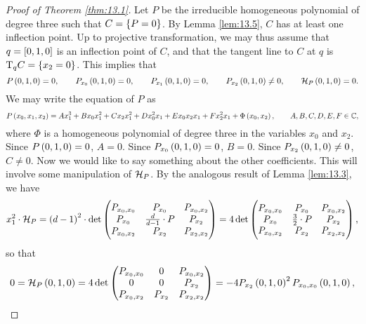 \begin{proof}[Proof of Theorem \ref{thm:13.1}]
Let $ P $ be the irreducible homogeneous polynomial of degree three such that $ C = \cbr{P = 0} $. By Lemma \ref{lem:13.5}, $ C $ has at least one inflection point. Up to projective transformation, we may thus assume that $ q = \sbr{0, 1, 0} $ is an inflection point of $ C $, and that the tangent line to $ C $ at $ q $ is $ \T_q C = \cbr{x_2 = 0} $. This implies that
$$ P\br{0, 1, 0} = 0, \qquad P_{x_0}\br{0, 1, 0} = 0, \qquad P_{x_1}\br{0, 1, 0} = 0, \qquad P_{x_2}\br{0, 1, 0} \ne 0, \qquad \HHH_P\br{0, 1, 0} = 0. $$
We may write the equation of $ P $ as
$$ P\br{x_0, x_1, x_2} = Ax_1^3 + Bx_0x_1^2 + Cx_2x_1^2 + Dx_0^2x_1 + Ex_0x_2x_1 + Fx_2^2x_1 + \Phi\br{x_0, x_2}, \qquad A, B, C, D, E, F \in \CC, $$
where $ \Phi $ is a homogeneous polynomial of degree three in the variables $ x_0 $ and $ x_2 $. Since $ P\br{0, 1, 0} = 0 $, $ A = 0 $. Since $ P_{x_0}\br{0, 1, 0} = 0 $, $ B = 0 $. Since $ P_{x_2}\br{0, 1, 0} \ne 0 $, $ C \ne 0 $. Now we would like to say something about the other coefficients. This will involve some manipulation of $ \mathcal{H}_P $. By the analogous result of Lemma \ref{lem:13.3}, we have
$$ x_1^2 \cdot \HHH_P = \br{d - 1}^2 \cdot \det \threebythree{P_{x_0, x_0}}{P_{x_0}}{P_{x_0, x_2}}{P_{x_0}}{\tfrac{d}{d - 1} \cdot P}{P_{x_2}}{P_{x_0, x_2}}{P_{x_2}}{P_{x_2, x_2}} = 4\det \threebythree{P_{x_0, x_0}}{P_{x_0}}{P_{x_0, x_2}}{P_{x_0}}{\tfrac{3}{2} \cdot P}{P_{x_2}}{P_{x_0, x_2}}{P_{x_2}}{P_{x_2, x_2}}, $$
so that
$$ 0 = \HHH_P\br{0, 1, 0} = 4\det \threebythree{P_{x_0, x_0}}{0}{P_{x_0, x_2}}{0}{0}{P_{x_2}}{P_{x_0, x_2}}{P_{x_2}}{P_{x_2, x_2}} = -4P_{x_2}\br{0, 1, 0}^2P_{x_0, x_0}\br{0, 1, 0}, $$

\pagebreak


\end{proof}
